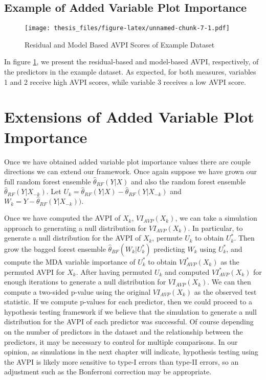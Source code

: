 \documentclass[12pt,twoside]{reedthesis}
\theoremstyle{definition}
\theoremstyle{definition}
\theoremstyle{definition}
\theoremstyle{remark}
\begin{document}
\subsection{Example of Added Variable Plot
Importance}\label{example-of-added-variable-plot-importance}
\begin{figure}
\centering
\texttt{[image: thesis\_files/figure-latex/unnamed-chunk-7-1.pdf]}
\caption{\label{fig:unnamed-chunk-7}\label{AVPIex}Residual and Model Based
AVPI Scores of Example Dataset}
\end{figure}
In figure \ref{AVPIex}, we present the residual-based and model-based
AVPI, respectively, of the predictors in the example dataset. As
expected, for both measures, variables 1 and 2 receive high AVPI scores,
while variable 3 receives a low AVPI score.

\section{Extensions of Added Variable Plot
Importance}\label{extensions-of-added-variable-plot-importance}

Once we have obtained added variable plot importance values there are
couple directions we can extend our framework. Once again suppose we
have grown our full random forest ensemble \(\hat{\theta}_{RF}(Y|X)\)
and also the random forest ensemble \(\hat{\theta}_{RF}(Y|X_{-k})\). Let
\(U_k=\hat{\theta}_{RF}(Y|X)-\hat{\theta}_{RF}(Y|X_{-k})\) and
\(W_k=Y-\hat{\theta}_{RF}(Y|X_{-k})).\) \par

Once we have computed the AVPI of \(X_k\), \(VI_{AVP}(X_k)\), we can
take a simulation approach to generating a null distribution for
\(VI_{AVP}(X_k)\). In particular, to generate a null distribution for
the AVPI of \(X_k\), permute \(U_k\) to obtain \(U_k^*\). Then grow the
bagged forest ensemble \(\hat{\theta}_{BF}(W_k|U_k^*)\) predicting
\(W_k\) using \(U_k^*\), and compute the MDA variable importance of
\(U_k^*\) to obtain \(VI_{AVP}^*(X_k)\) as the permuted AVPI for
\(X_k\). After having permuted \(U_k\) and computed \(VI_{AVP}^*(X_k)\)
for enough iterations to generate a null distribution for
\(VI_{AVP}(X_k)\). We can then compute a two-sided p-value using the
original \(VI_{AVP}(X_k)\) as the observed test statistic. If we compute
p-values for each predictor, then we could proceed to a hypothesis
testing framework if we believe that the simulation to generate a null
distribution for the AVPI of each predictor was successful. Of course
depending on the number of predictors in the dataset and the
relationship between the predictors, it may be necessary to control for
multiple comparisons. In our opinion, as simulations in the next chapter
will indicate, hypothesis testing using the AVPI is likely more
sensitive to type-I errors than type-II errors, so an adjustment such as
the Bonferroni correction may be appropriate. \par
\end{document}

